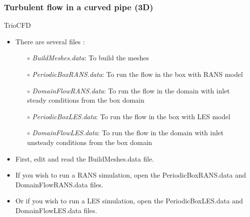 \documentclass[10pt, hyperref={unicode=true,pdfusetitle, bookmarks=true,bookmarksnumbered=false,bookmarksopen=false, breaklinks=false,pdfborder={0 0 1},backref=true,colorlinks=true,linkcolor=darkblue,pageanchor}]{beamer}
\begin{document}
\begin{frame}
\frametitle{Turbulent flow in a curved pipe (3D)}
\begin{block}{TrioCFD}

\begin{itemize}
\item There are several files :\\
    \begin{itemize}
    \item [$\circ$] \textit{BuildMeshes.data}: To build the meshes\\
    \item [$\circ$] \textit{PeriodicBoxRANS.data}: To run the flow in the box with RANS model\\
    \item [$\circ$] \textit{DomainFlowRANS.data}: To run the flow in the domain with inlet steady conditions from the box domain\\
    \item [$\circ$] \textit{PeriodicBoxLES.data}: To run the flow in the box with LES model\\
    \item [$\circ$] \textit{DomainFlowLES.data}: To run the flow in the domain with inlet unsteady conditions from the box domain
    \end{itemize}

\item First, edit and read the BuildMeshes.data file.

\item If you wish to run a RANS simulation, open the PeriodicBoxRANS.data and DomainFlowRANS.data files.

\item Or if you wish to run a LES simulation, open the PeriodicBoxLES.data and DomainFlowLES.data files.
\end{itemize}

\end{block}
\end{frame}
\end{document}
